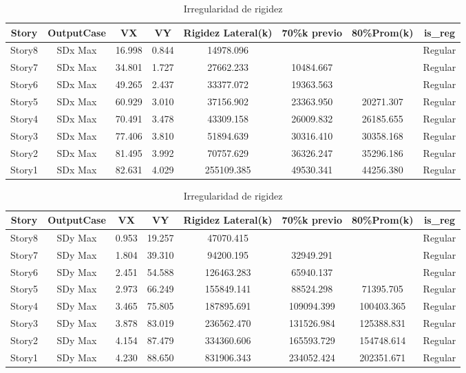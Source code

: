 \documentclass{article}%
\begin{document}
\begin{table}[h!]%
\centering%
\caption{Irregularidad de rigidez}%
\begin{tabular}{cccccccc}
\toprule
Story & OutputCase & VX & VY & Rigidez Lateral(k) & 70\%k previo & 80\%Prom(k) & is\_reg \\
\midrule
Story8 & SDx Max & 16.998 & 0.844 & 14978.096 &  &  & Regular \\
Story7 & SDx Max & 34.801 & 1.727 & 27662.233 & 10484.667 &  & Regular \\
Story6 & SDx Max & 49.265 & 2.437 & 33377.072 & 19363.563 &  & Regular \\
Story5 & SDx Max & 60.929 & 3.010 & 37156.902 & 23363.950 & 20271.307 & Regular \\
Story4 & SDx Max & 70.491 & 3.478 & 43309.158 & 26009.832 & 26185.655 & Regular \\
Story3 & SDx Max & 77.406 & 3.810 & 51894.639 & 30316.410 & 30358.168 & Regular \\
Story2 & SDx Max & 81.495 & 3.992 & 70757.629 & 36326.247 & 35296.186 & Regular \\
Story1 & SDx Max & 82.631 & 4.029 & 255109.385 & 49530.341 & 44256.380 & Regular \\
\bottomrule
\end{tabular}
%
\end{table}

%


\begin{table}[h!]%
\centering%
\caption{Irregularidad de rigidez}%
\begin{tabular}{cccccccc}
\toprule
Story & OutputCase & VX & VY & Rigidez Lateral(k) & 70\%k previo & 80\%Prom(k) & is\_reg \\
\midrule
Story8 & SDy Max & 0.953 & 19.257 & 47070.415 &  &  & Regular \\
Story7 & SDy Max & 1.804 & 39.310 & 94200.195 & 32949.291 &  & Regular \\
Story6 & SDy Max & 2.451 & 54.588 & 126463.283 & 65940.137 &  & Regular \\
Story5 & SDy Max & 2.973 & 66.249 & 155849.141 & 88524.298 & 71395.705 & Regular \\
Story4 & SDy Max & 3.465 & 75.805 & 187895.691 & 109094.399 & 100403.365 & Regular \\
Story3 & SDy Max & 3.878 & 83.019 & 236562.470 & 131526.984 & 125388.831 & Regular \\
Story2 & SDy Max & 4.154 & 87.479 & 334360.606 & 165593.729 & 154748.614 & Regular \\
Story1 & SDy Max & 4.230 & 88.650 & 831906.343 & 234052.424 & 202351.671 & Regular \\
\bottomrule
\end{tabular}
%
\end{table}
\end{document}
